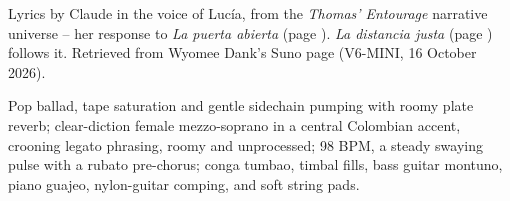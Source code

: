 
\label{sec:la-puerta-esta-abierta}
\begin{notes}
Lyrics by Claude in the voice of Lucía, from the \emph{Thomas' Entourage} narrative universe -- her response to \emph{La puerta abierta} (page \pageref{sec:la-puerta-abierta}). \emph{La distancia justa} (page \pageref{sec:la-distancia-justa}) follows it. Retrieved from Wyomee Dank's Suno page (V6-MINI, 16 October 2026).
\end{notes}
\begin{style}
Pop ballad, tape saturation and gentle sidechain pumping with roomy plate reverb; clear-diction female mezzo-soprano in a central Colombian accent, crooning legato phrasing, roomy and unprocessed; 98 BPM, a steady swaying pulse with a rubato pre-chorus; conga tumbao, timbal fills, bass guitar montuno, piano guajeo, nylon-guitar comping, and soft string pads.
\end{style}

